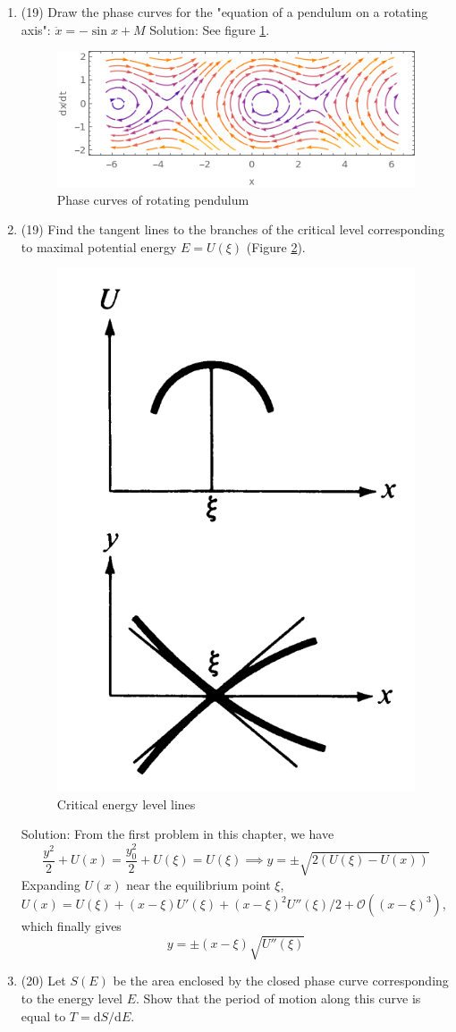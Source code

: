 \begin{enumerate}
\item (19) Draw the phase curves for the "equation of a pendulum on a rotating axis": $\ddot{x} = -\sin x + M$
Solution: See figure \ref{fig:2pendulumstreamrot}.
\begin{figure}
	\centering
	\includegraphics[width=0.7\linewidth]{2_pendulumstreamrot}
	\caption{Phase curves of rotating pendulum}
	\label{fig:2pendulumstreamrot}
\end{figure}
\item (19) Find the tangent lines to the branches of the critical level corresponding to maximal potential energy $E = U(\xi)$ (Figure \ref{fig:2critical}).\par
\begin{figure}
	\centering
	\includegraphics[width=0.5\linewidth]{2_critical}
	\caption{Critical energy level lines}
	\label{fig:2critical}
\end{figure}
Solution:  From the first problem in this chapter, we have \begin{equation}\label{key}
		\frac{y^2}{2} +U(x) = \frac{y_0^2}{2} + U(\xi) = U(\xi)\implies y = \pm\sqrt{2(U(\xi)-U(x))}
\end{equation}
Expanding $U(x)$ near the equilibrium point $\xi$, $U(x) = U(\xi)+(x-\xi)U'(\xi) +(x-\xi)^2 U''(\xi)/2 +\mathcal{O}((x-\xi)^3)$, which finally gives
\begin{equation}
	y = \pm (x-\xi)\sqrt{U''(\xi)}
\end{equation}
\item (20) Let $S(E)$ be the area enclosed by the closed phase curve corresponding to the energy level $E$. Show that the period of motion along this curve is equal to $T = \mathrm{d}S/\mathrm{d}E$.\par


\end{enumerate}
